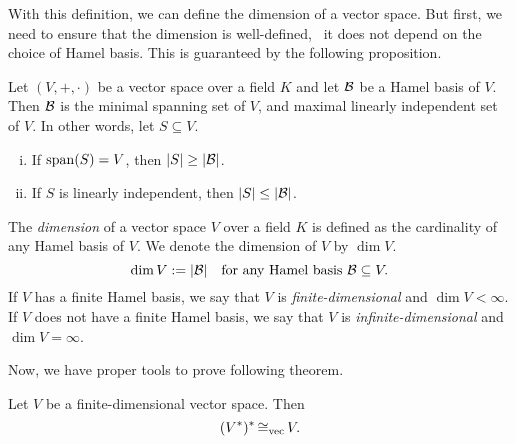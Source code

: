 With this definition, we can define the dimension of a vector space. But first, we need to ensure that the dimension is well-defined, \ie\ it does not depend on the choice of Hamel basis. This is guaranteed by the following proposition.
\begin{proposition}
    Let \((V, +, \cdot)\) be a vector space over a field \(K\) and let \(\mathcal B\) be a Hamel basis of \(V\). Then \(\mathcal B\) is the minimal spanning set of \(V\), and maximal linearly independent set of \(V\). In other words, let \(S \subseteq V\).
    \begin{enumerate}[(i)]
        \item If \(\operatorname{span}(S) = V\), then \(\abs{S} \geq \abs{\mathcal B}\).
        \item If \(S\) is linearly independent, then \(\abs{S} \leq \abs{\mathcal B}\).
    \end{enumerate}
\end{proposition}
\begin{definition}[Dimension]
    The \emph{dimension} of a vector space \(V\) over a field \(K\) is defined as the cardinality of any Hamel basis of \(V\). We denote the dimension of \(V\) by \(\dim V\).
    \begin{equation}
        \dim V := \abs{\mathcal B} \quad \text{for any Hamel basis } \mathcal B \subseteq V.
    \end{equation}
    If \(V\) has a finite Hamel basis, we say that \(V\) is \emph{finite-dimensional} and \(\dim V < \infty\). If \(V\) does not have a finite Hamel basis, we say that \(V\) is \emph{infinite-dimensional} and \(\dim V = \infty\).
\end{definition}
Now, we have proper tools to prove following theorem.
\begin{theorem}
    Let \(V\) be a finite-dimensional vector space. Then
    \begin{equation}
        (V^*)^* \operatorname{\cong_{\text{vec}}} V.
    \end{equation}
\end{theorem}
